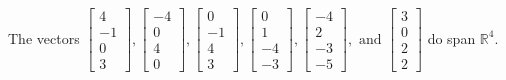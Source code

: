 \begin{exercise}
\begin{exerciseStatement}
  \end{exerciseStatement}
  \begin{exerciseAnswer}
   The vectors \(\left[\begin{array}{r}
4 \\
-1 \\
0 \\
3
\end{array}\right] , \left[\begin{array}{r}
-4 \\
0 \\
4 \\
0
\end{array}\right] , \left[\begin{array}{r}
0 \\
-1 \\
4 \\
3
\end{array}\right] , \left[\begin{array}{r}
0 \\
1 \\
-4 \\
-3
\end{array}\right] , \left[\begin{array}{r}
-4 \\
2 \\
-3 \\
-5
\end{array}\right] , \text{ and } \left[\begin{array}{r}
3 \\
0 \\
2 \\
2
\end{array}\right]\) 
  	 do  
	span \(\mathbb{R}^4\).
  


  \end{exerciseAnswer}
\end{exercise}